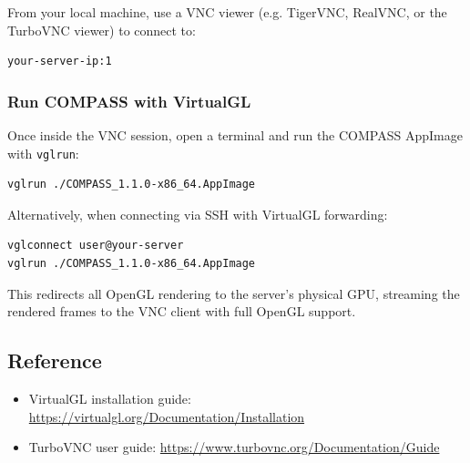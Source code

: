 From your local machine, use a VNC viewer (e.g. TigerVNC, RealVNC, or the TurboVNC viewer) to connect to:

\begin{lstlisting}
your-server-ip:1
\end{lstlisting}

\subsubsection{Run COMPASS with VirtualGL}

Once inside the VNC session, open a terminal and run the COMPASS AppImage with \texttt{vglrun}:

\begin{lstlisting}
vglrun ./COMPASS_1.1.0-x86_64.AppImage
\end{lstlisting}

Alternatively, when connecting via SSH with VirtualGL forwarding:

\begin{lstlisting}
vglconnect user@your-server
vglrun ./COMPASS_1.1.0-x86_64.AppImage
\end{lstlisting}

This redirects all OpenGL rendering to the server's physical GPU, streaming the rendered frames to the VNC client with full OpenGL support.

\subsection{Reference}

\begin{itemize}
\item VirtualGL installation guide: \url{https://virtualgl.org/Documentation/Installation}
\item TurboVNC user guide: \url{https://www.turbovnc.org/Documentation/Guide}
\end{itemize}
